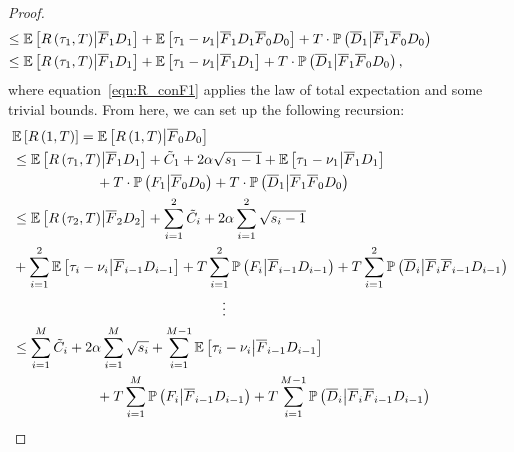 \documentclass[twoside]{article}
\def\eqref#1{equation~\ref{#1}}
\newcommand{\E}{\mathbb{E}}
\theoremstyle{plain}
\theoremstyle{definition}
\theoremstyle{remark}
\begin{document}
\begin{proof}
\begin{subequations}
\begin{align}
            &\hspace{-60pt}\leq\E\left[R\left(\tau_{1},T\right)\middle| \overline{F}_{1}D_{1}\right] + \E\left[\tau_{1}-\nu_{1}\middle| \overline{F}_{1}D_{1}\overline{F}_{0}D_{0}\right]\label{eqn:reg_split2}+T\cdot\mathbb{P}\left(\overline{D}_{1}\middle| \overline{F}_{1}\overline{F}_{0}D_{0}\right)\\
            &\hspace{-60pt}\leq\E\left[R\left(\tau_{1},T\right)\middle| \overline{F}_{1}D_{1}\right] + \E\left[\tau_{1}-\nu_{1}\middle| \overline{F}_{1}D_{1}\right]+T\cdot\mathbb{P}\left(\overline{D}_{1}\middle| \overline{F}_{1}\overline{F}_{0}D_{0}\right)\label{eqn:reg_split3},
        \end{align}
    \end{subequations}
    where \eqref{eqn:R_conF1} applies the law of total expectation and some trivial bounds.%
    From here, we can set up the following recursion:
    \begin{subequations}
        \begin{align}
            &\E\left[R\left(1,T\right)\right] =\E\left[R\left(1,T\right)\middle|\overline{F}_{0}D_{0}\right] \\
            & \leq \E\left[R\left(\tau_{1},T\right)\middle|\overline{F}_{1}D_{1}\right]+\tilde{C}_{1}+2\alpha\sqrt{s_{1}-1}+\E\left[\tau_{1}-\nu_{1}\middle| \overline{F}_{1}D_{1}\right]\\
            &\hspace{+60pt}+T\cdot\mathbb{P}\left(F_{1}\middle| \overline{F}_{0}D_{0}\right)+T\cdot\mathbb{P}\left(\overline{D}_{1}\middle| \overline{F}_{1}\overline{F}_{0}D_{0}\right) \\
            & \leq \E\left[R\left(\tau_{2},T\right)\middle|\overline{F}_{2}D_{2}\right]+\sum^{2}_{i=1}\tilde{C}_{i}+2\alpha\sum^{2}_{i=1}\sqrt{s_{i}-1}\\ 
            &+\sum^{2}_{i=1}\E\left[\tau_{i}-\nu_{i}\middle| \overline{F}_{i-1}D_{i-1}\right]+T\sum^{2}_{i=1}\mathbb{P}\left(F_{i}\middle| \overline{F}_{i-1}D_{i-1}\right)+T\sum^{2}_{i=1}\mathbb{P}\left(\overline{D}_{i}\middle| \overline{F}_{i}\overline{F}_{i-1}D_{i-1}\right) \\
            &\hspace{+150pt}\vdots\nonumber\\
            & \leq \sum^{M}_{i=1}\tilde{C}_{i}+2\alpha\sum^{M}_{i=1}\sqrt{s_{i}}+\sum^{M-1}_{i=1}\E\left[\tau_{i}-\nu_{i}\middle| \overline{F}_{i-1}D_{i-1}\right]\\
            &\hspace{+60pt}+T\sum^{M}_{i=1}\mathbb{P}\left(F_{i}\middle| \overline{F}_{i-1}D_{i-1}\right)+T\sum^{M-1}_{i=1}\mathbb{P}\left(\overline{D}_{i}\middle| \overline{F}_{i}\overline{F}_{i-1}D_{i-1}\right)\\

\end{align}
\end{subequations}
\end{proof}
\end{document}
